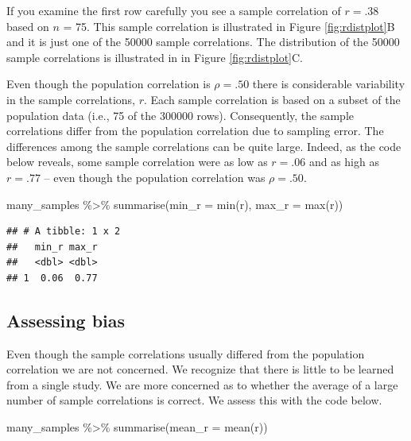 \documentclass[
]{krantz}
\makeatletter
\newenvironment{Shaded}{\begin{snugshade}}{\end{snugshade}}
\newcommand{\AttributeTok}[1]{\textcolor[rgb]{0.61,0.61,0.61}{#1}}
\newcommand{\FunctionTok}[1]{\textcolor[rgb]{0,0,0}{#1}}
\newcommand{\NormalTok}[1]{#1}
\newcommand{\SpecialCharTok}[1]{\textcolor[rgb]{0,0,0}{#1}}
\newenvironment{kframe}{%
\medskip{}
\setlength{\fboxsep}{.8em}
 \def\at@end@of@kframe{}%
 \ifinner\ifhmode%
  \def\at@end@of@kframe{\end{minipage}}%
  \begin{minipage}{\columnwidth}%
 \fi\fi%
 \def\FrameCommand##1{\hskip\@totalleftmargin \hskip-\fboxsep
 \colorbox{shadecolor}{##1}\hskip-\fboxsep
     \hskip-\linewidth \hskip-\@totalleftmargin \hskip\columnwidth}%
 \MakeFramed {\advance\hsize-\width
   \@totalleftmargin\z@ \linewidth\hsize
   \@setminipage}}%
 {\par\unskip\endMakeFramed%
 \at@end@of@kframe}
\renewenvironment{Shaded}{\begin{kframe}}{\end{kframe}}
\makeatother
\begin{document}
If you examine the first row carefully you see a sample correlation of \(r = .38\) based on \(n\) = 75. This sample correlation is illustrated in Figure \ref{fig:rdistplot}B and it is just one of the 50000 sample correlations. The distribution of the 50000 sample correlations is illustrated in in Figure \ref{fig:rdistplot}C.

Even though the population correlation is \(\rho = .50\) there is considerable variability in the sample correlations, \(r\). Each sample correlation is based on a subset of the population data (i.e., 75 of the 300000 rows). Consequently, the sample correlations differ from the population correlation due to sampling error. The differences among the sample correlations can be quite large. Indeed, as the code below reveals, some sample correlation were as low as \(r = .06\) and as high as \(r = .77\) -- even though the population correlation was \(\rho = .50\).

\begin{Shaded}
\begin{Highlighting}[]
\NormalTok{many\_samples }\SpecialCharTok{\%\textgreater{}\%}
  \FunctionTok{summarise}\NormalTok{(}\AttributeTok{min\_r =} \FunctionTok{min}\NormalTok{(r),}
            \AttributeTok{max\_r =} \FunctionTok{max}\NormalTok{(r))}
\end{Highlighting}
\end{Shaded}

\begin{verbatim}
## # A tibble: 1 x 2
##   min_r max_r
##   <dbl> <dbl>
## 1  0.06  0.77
\end{verbatim}

\hypertarget{assessing-bias-3}{%
\subsection{Assessing bias}\label{assessing-bias-3}}

Even though the sample correlations usually differed from the population correlation we are not concerned. We recognize that there is little to be learned from a single study. We are more concerned as to whether the average of a large number of sample correlations is correct. We assess this with the code below.

\begin{Shaded}
\begin{Highlighting}[]
\NormalTok{many\_samples }\SpecialCharTok{\%\textgreater{}\%}
  \FunctionTok{summarise}\NormalTok{(}\AttributeTok{mean\_r =} \FunctionTok{mean}\NormalTok{(r))}
\end{Highlighting}
\end{Shaded}
\end{document}
